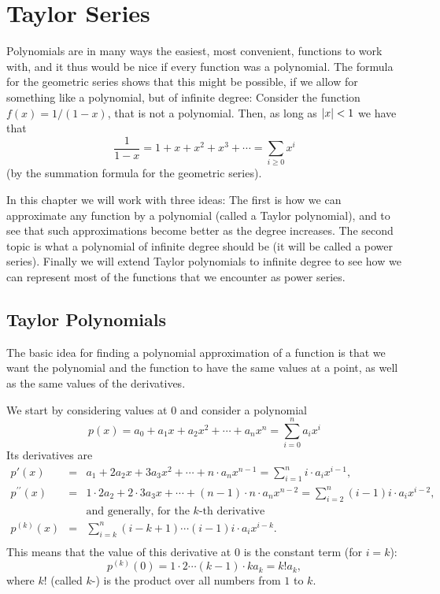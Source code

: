 \chapter{Taylor Series}
\label{chtaylor}

Polynomials are in many ways the easiest, most convenient, functions to
work with, and it thus would be nice if every function was a polynomial. The
formula for the geometric series shows that this might be possible, if we
allow for something like a polynomial, but of infinite degree:
Consider the function $f(x)=1/(1-x)$, that is not a polynomial. Then, as
long as $\left|x\right|<1$ we have that
\[
\frac{1}{1-x}=1+x+x^2+x^3+\cdots=\sum_{i\ge 0} x^i
\]
(by the summation formula for the geometric series).

In this chapter we will work with three ideas: The first is how we can
approximate any function by a polynomial (called a Taylor polynomial), and to see that such
approximations become better as the degree increases.
The second topic is what a polynomial of infinite degree should be (it will
be called a power series). Finally we will extend Taylor polynomials to
infinite degree to see how we can represent most of the functions that we
encounter as power series.

\section{Taylor Polynomials}

The basic idea for finding a polynomial approximation of a function is that
we want the polynomial and the function to have the same values at a point,
as well as the same values of the derivatives.

We start by considering values at $0$ and consider a polynomial
\[
p(x)=a_0+a_1x+a_2x^2+\cdots+a_nx^n=\sum_{i=0}^n a_i x^i
\]
Its derivatives are
\begin{eqnarray*}
p'(x)&=&a_1+2a_2x+3a_3x^2+\cdots+n\cdot a_nx^{n-1}=\sum_{i=1}^n i\cdot a_i x^{i-1},\\
p^{\prime\prime}(x)&=&1\cdot 2a_2+2\cdot 3a_3x+\cdots+(n-1)\cdot n\cdot
a_nx^{n-2}=\sum_{i=2}^n (i-1)i\cdot a_i x^{i-2},\\
&&\mbox{and generally, for the $k$-th derivative }\\
p^{(k)}(x)&=&\sum_{i=k}^n (i-k+1)\cdots(i-1)i\cdot a_i x^{i-k}.\\
\end{eqnarray*}
This means that the value of this derivative at $0$ is the constant term
(for $i=k$):
\[
p^{(k)}(0)=1\cdot2\cdots(k-1)\cdot k a_k=k! a_k,
\]
where $k!$ (called $k$-) is the product over all numbers
from $1$ to $k$.
\smallskip

